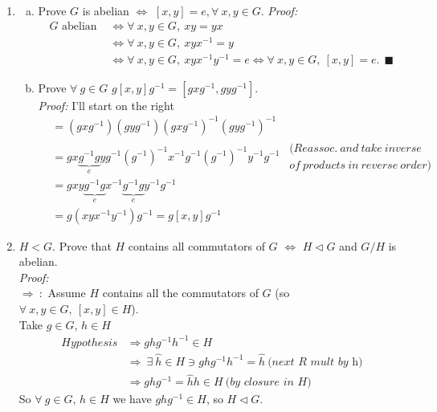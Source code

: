 \begin{enumerate}
    \item  
    \begin{enumerate}[a)]
        \item Prove $G$ is abelian $\iff$ $[x,y]=e, \forall \ x,y \in G$.
        \textit{Proof:}
        \begin{align*}
            G \text{ abelian } &\iff \forall \ x,y \in G, \ xy = yx \\
            &\iff \forall \ x,y \in G, \ xyx^{-1}=y \\
            &\iff \forall \ x,y \in G, \ xyx^{-1}y^{-1} = e \iff \forall \ x,y \in G, \ [x,y]=e. \ \ \blacksquare
        \end{align*}
        \item Prove $\forall \ g \in G $ $g[x,y]g^{-1}= [gxg^{-1}, gyg^{-1}].$ \\
        \textit{Proof:} I'll start on the right
        \begin{align*}
            [gxg^{-1}, gyg^{-1}] &= (gxg^{-1})(gyg^{-1})(gxg^{-1})^{-1}(gyg^{-1})^{-1} \\
            &= gx\underbrace{g^{-1}g}_{e}yg^{-1}(g^{-1})^{-1}x^{-1}g^{-1}(g^{-1})^{-1}y^{-1}g^{-1} \ \ \substack{  (Reassoc. \ and \ take \ inverse \\ of \ products \ in \ reverse \ order)} \\
            &= gxy\underbrace{g^{-1}g}_e x^{-1}\underbrace{g^{-1}g}_e y^{-1}g^{-1} \\
            &= g(xyx^{-1}y^{-1})g^{-1}=g[x,y]g^{-1}
        \end{align*}
    \end{enumerate}
    \item $H<G$. Prove that $H$ contains all commutators of $G$ $\iff$ $H\triangleleft G$ and $G/H$ is abelian. \\
    \textit{Proof:} \\
    $\boxed{\Rightarrow \ :}$ Assume $H$ contains all the commutators of $G$ (so $\forall \ x,y\in G, \ [x,y]\in H$).\\
    Take $g\in G$, $h\in H$
    \begin{align*}
        Hypothesis &\Rightarrow ghg^{-1}h^{-1}\in H \\
        &\Rightarrow \ \exists \ \hat{h}\in H \ni ghg^{-1}h^{-1}=\hat{h} \ \textit{(next R mult by h)} \\
        &\Rightarrow ghg^{-1}=\hat{h}h \in H \ \textit{(by closure in H)}
    \end{align*}
    So $\forall \ g\in G$, $h\in H$ we have $ghg^{-1}\in H$, so $H\triangleleft G$. \\

\end{enumerate}
